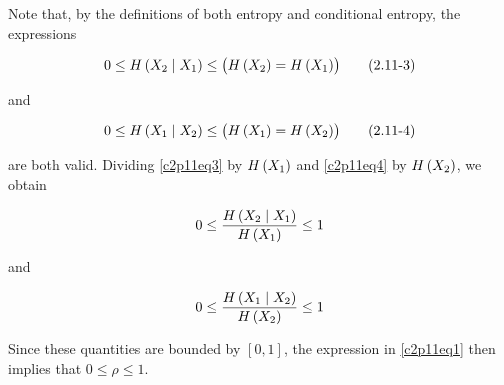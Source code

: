 \documentclass[ClusteringConnectionsMAIN.tex]{subfiles}
\begin{document}
	

  Note that, by the definitions of both entropy and conditional entropy, the expressions

\begin{align} \label{c2p11eq3}
0 \leq H \left(  X_2 \mid X_1  \right) \leq \bigl( H \left( X_2 \right) = H \left( X_1 \right) \bigr)   \tag{2.11-3}
\end{align}

and 

\begin{align} \label{c2p11eq4}
0 \leq H \left(  X_1 \mid X_2  \right) \leq \bigl( H \left( X_1 \right) = H \left( X_2 \right) \bigr)   \tag{2.11-4}
\end{align}

are both valid.  Dividing \ref{c2p11eq3} by $H \left( X_1 \right)$ and \ref{c2p11eq4} by $H \left( X_2 \right)$, we obtain

\begin{align} 
0 \leq \frac{ H \left(  X_2 \mid X_1  \right) }{ H \left( X_1 \right) }  \leq 1  \notag
\end{align}

and 

\begin{align} 
0 \leq \frac{ H \left(  X_1 \mid X_2  \right) }{ H \left( X_2 \right) }  \leq 1  \notag
\end{align}

Since these quantities are bounded by $\left[ 0, 1 \right]$, the expression in \ref{c2p11eq1} then implies that $0 \leq \rho \leq 1$.
\end{document}
